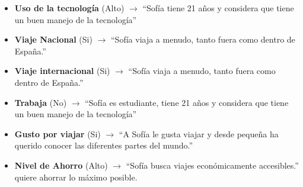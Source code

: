 \begin{itemize}
    \item \textbf{Uso de la tecnología} (Alto) $\rightarrow$ “Sofía tiene 21 años y considera que tiene un buen manejo de la tecnología”
    \item \textbf{Viaje Nacional} (Si) $\rightarrow$ “Sofía viaja a menudo, tanto fuera como dentro de España.”
    \item \textbf{Viaje internacional} (Si) $\rightarrow$ “Sofía viaja a menudo, tanto fuera como dentro de España.”
    \item \textbf{Trabaja} (No) $\rightarrow$ “Sofía es estudiante, tiene 21 años y considera que tiene un buen manejo de la tecnología” 
    \item \textbf{Gusto por viajar} (Si) $\rightarrow$ “A Sofía le gusta viajar y desde pequeña ha querido conocer las diferentes partes del mundo.”
    \item \textbf{Nivel de Ahorro} (Alto) $\rightarrow$ “Sofía busca viajes económicamente accesibles.” quiere ahorrar lo máximo posible.
\end{itemize}

